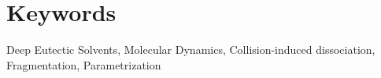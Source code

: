 \section*{Keywords}
Deep Eutectic Solvents, Molecular Dynamics, Collision-induced dissociation, Fragmentation, Parametrization